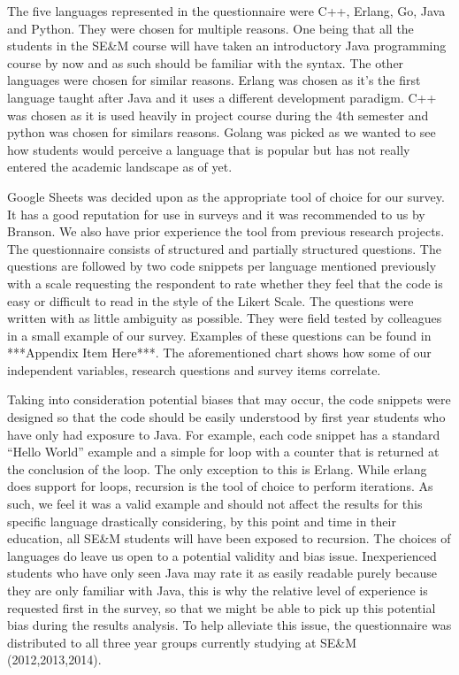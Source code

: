 \documentclass[times, 10pt,twocolumn]{IEEEtran}
\begin{document}
\newline


The five languages represented in the questionnaire were C++, Erlang, Go, Java and Python. They were chosen for multiple reasons. One being that all the students in the SE\&M course will have taken an introductory Java programming course by now and as such should be familiar with the syntax. The other languages were chosen for similar reasons. Erlang was chosen as it's the first language taught after Java and it uses a different development paradigm. C++ was chosen as it is used heavily in project course during the 4th semester and python was chosen for similars reasons. Golang was picked as we wanted to see how students would perceive a language that is popular but has not really entered the academic landscape as of yet.

Google Sheets was decided upon as the appropriate tool of choice for our survey. It has a good reputation for use in surveys and it was recommended to us by Branson. We also have prior experience the tool from previous research projects.
The questionnaire consists of structured and partially structured questions. The questions are followed by two code snippets per language mentioned previously with a scale requesting the respondent to rate whether they feel that the code is easy or difficult to read in the style of the Likert Scale. The questions were written with as little ambiguity as possible. They were field tested by colleagues in a small example of our survey. Examples of these questions can be found in ***Appendix Item Here***. The aforementioned chart shows how some of our independent variables, research questions and survey items correlate.

Taking into consideration potential biases that may occur, the code snippets were designed so that the code should be easily understood by first year students who have only had exposure to Java. For example, each code snippet has a standard ``Hello World'' example and a simple for loop with a counter that is returned at the conclusion of the loop. The only exception to this is Erlang. While erlang does support for loops, recursion is the tool of choice to perform iterations. As such, we feel it was a valid example and should not affect the results for this specific language drastically considering, by this point and time in their education, all SE\&M students will have been exposed to recursion. The choices of languages do leave us open to a potential validity and bias issue. Inexperienced students who have only seen Java may rate it as easily readable purely because they are only familiar with Java, this is why the relative level of experience is requested first in the survey, so that we might be able to pick up this potential bias during the results analysis. To help alleviate this issue, the questionnaire was distributed to all three year groups currently studying at SE\&M (2012,2013,2014).
\end{document}
